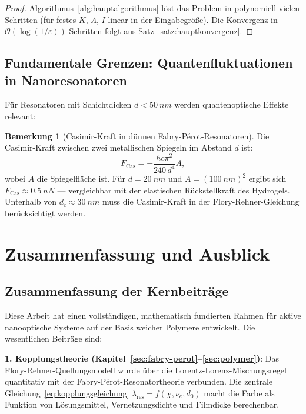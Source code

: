 ﻿\documentclass[a4paper,12pt]{article}
\theoremstyle{definition}
\newtheorem{bemerkung}{Bemerkung}[section]
\newcommand{\ordre}[1]{\mathcal{O}\!\left(#1\right)}
\begin{document}
	\begin{proof}
		Algorithmus~\ref{alg:hauptalgorithmus} löst das Problem in polynomiell
		vielen Schritten (für festes $K$, $\Lambda$, $I$ linear in der Eingabegröße).
		Die Konvergenz in $\ordre{\log(1/\varepsilon)}$ Schritten folgt aus
		Satz~\ref{satz:hauptkonvergenz}.
	\end{proof}
	
	\subsection{Fundamentale Grenzen: Quantenfluktuationen in Nanoresonatoren}
	
	Für Resonatoren mit Schichtdicken $d < \SI{50}{nm}$ werden
	quantenoptische Effekte relevant:
	
	\begin{bemerkung}[Casimir-Kraft in dünnen Fabry-Pérot-Resonatoren]
		Die Casimir-Kraft zwischen zwei metallischen Spiegeln im Abstand $d$ ist:
		\begin{equation}
			F_\mathrm{Cas} = -\frac{\hbar c \pi^2}{240\, d^4} A,
			\label{eq:casimir}
		\end{equation}
		wobei $A$ die Spiegelfläche ist. Für $d = \SI{20}{nm}$ und
		$A = (\SI{100}{nm})^2$ ergibt sich $F_\mathrm{Cas} \approx \SI{0.5}{nN}$ ---
		vergleichbar mit der elastischen Rückstellkraft des Hydrogels.
		Unterhalb von $d_c \approx \SI{30}{nm}$ muss die Casimir-Kraft in der
		Flory-Rehner-Gleichung berücksichtigt werden.
	\end{bemerkung}
	
	\section{Zusammenfassung und Ausblick}
	\label{sec:zusammenfassung}
	
	\subsection{Zusammenfassung der Kernbeiträge}
	
	Diese Arbeit hat einen vollständigen, mathematisch fundierten Rahmen für
	aktive nanooptische Systeme auf der Basis weicher Polymere entwickelt.
	Die wesentlichen Beiträge sind:
	
	\textbf{1. Kopplungstheorie (Kapitel~\ref{sec:fabry-perot}--\ref{sec:polymer})}:
	Das Flory-Rehner-Quellungsmodell wurde über die Lorentz-Lorenz-Mischungsregel
	quantitativ mit der Fabry-Pérot-Resonatortheorie verbunden. Die zentrale
	Gleichung~\eqref{eq:kopplungsgleichung} $\lambda_\mathrm{res} = f(\chi, \nu_e, d_0)$
	macht die Farbe als Funktion von Lösungsmittel, Vernetzungsdichte und
	Filmdicke berechenbar.
	
\end{document}
